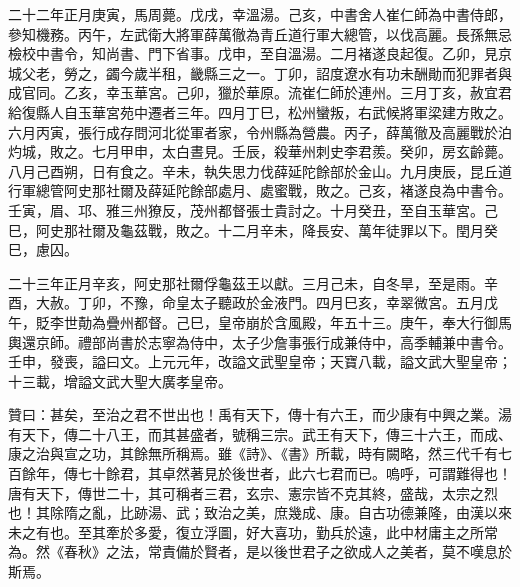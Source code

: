 \begin{pinyinscope}
 二十二年正月庚寅，馬周薨。戊戌，幸溫湯。己亥，中書舍人崔仁師為中書侍郎，參知機務。丙午，左武衛大將軍薛萬徹為青丘道行軍大總管，以伐高麗。長孫無忌檢校中書令，知尚書、門下省事。戊申，至自溫湯。二月褚遂良起復。乙卯，見京城父老，勞之，蠲今歲半租，畿縣三之一。丁卯，詔度遼水有功未酬勛而犯罪者與成官同。乙亥，幸玉華宮。己卯，獵於華原。流崔仁師於連州。三月丁亥，赦宜君給復縣人自玉華宮苑中遷者三年。四月丁巳，松州蠻叛，右武候將軍梁建方敗之。六月丙寅，張行成存問河北從軍者家，令州縣為營農。丙子，薛萬徹及高麗戰於泊灼城，敗之。七月甲申，太白晝見。壬辰，殺華州刺史李君羨。癸卯，房玄齡薨。八月己酉朔，日有食之。辛未，執失思力伐薛延陀餘部於金山。九月庚辰，昆丘道行軍總管阿史那社爾及薛延陀餘部處月、處蜜戰，敗之。己亥，褚遂良為中書令。壬寅，眉、邛、雅三州獠反，茂州都督張士貴討之。十月癸丑，至自玉華宮。己巳，阿史那社爾及龜茲戰，敗之。十二月辛未，降長安、萬年徒罪以下。閏月癸巳，慮囚。



 二十三年正月辛亥，阿史那社爾俘龜茲王以獻。三月己未，自冬旱，至是雨。辛酉，大赦。丁卯，不豫，命皇太子聽政於金液門。四月巳亥，幸翠微宮。五月戊午，貶李世勣為疊州都督。己巳，皇帝崩於含風殿，年五十三。庚午，奉大行御馬輿還京師。禮部尚書於志寧為侍中，太子少詹事張行成兼侍中，高季輔兼中書令。壬申，發喪，謚曰文。上元元年，改謚文武聖皇帝；天寶八載，謚文武大聖皇帝；十三載，增謚文武大聖大廣孝皇帝。



 贊曰：甚矣，至治之君不世出也！禹有天下，傳十有六王，而少康有中興之業。湯有天下，傳二十八王，而其甚盛者，號稱三宗。武王有天下，傳三十六王，而成、康之治與宣之功，其餘無所稱焉。雖《詩》、《書》所載，時有闕略，然三代千有七百餘年，傳七十餘君，其卓然著見於後世者，此六七君而已。嗚呼，可謂難得也！唐有天下，傳世二十，其可稱者三君，玄宗、憲宗皆不克其終，盛哉，太宗之烈也！其除隋之亂，比跡湯、武；致治之美，庶幾成、康。自古功德兼隆，由漢以來未之有也。至其牽於多愛，復立浮圖，好大喜功，勤兵於遠，此中材庸主之所常為。然《春秋》之法，常責備於賢者，是以後世君子之欲成人之美者，莫不嘆息於斯焉。



\end{pinyinscope}